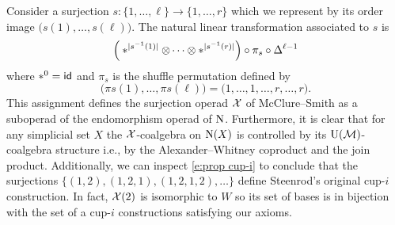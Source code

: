 Consider a surjection $s \colon \{1, \dots, \ell\} \to \{1, \dots, r\}$ which we represent by its order image $\big( s(1), \dots, s(\ell) \big)$.
The natural linear transformation associated to $s$ is
\begin{equation} \label{e:surjection action}
\Big( \ast^{\lvert s^{-1}(1)\rvert} \otimes \dotsb \otimes \ast^{\lvert s^{-1}(r)\rvert} \Big) \circ \pi_s \circ \Delta^{\ell-1}
\end{equation}
where $\ast^0 = \mathsf{id}$ and $\pi_s$ is the shuffle permutation defined by
\[
\big( \pi s(1), \dots, \pi s(\ell) \big) =
\big( 1, \dots, 1, \dots, r, \dots, r \big).
\]
This assignment defines the surjection operad $\mathcal{X}$ of McClure--Smith \cite{mcclure2003multivariable} as a suboperad of the endomorphism operad of $\operatorname{N}$.
Furthermore, it is clear that for any simplicial set $X$ the $\mathcal{X}$-coalgebra on $\operatorname{N}(X)$ is controlled by its ${\operatorname{U}(\mathcal{M})}$-coalgebra structure i.e., by the Alexander--Whitney coproduct and the join product.
Additionally, we can inspect \cref{e:prop cup-i} to conclude that the surjections $\big\{ (1,2), (1,2,1), (1,2,1,2), \dots \big\}$ define Steenrod's original \mbox{cup-$i$} construction.
In fact, $\mathcal{X}(2)$ is isomorphic to $W$ so its set of bases is in bijection with the set of a \mbox{cup-$i$} constructions satisfying our axioms.

\subsubsection{}

